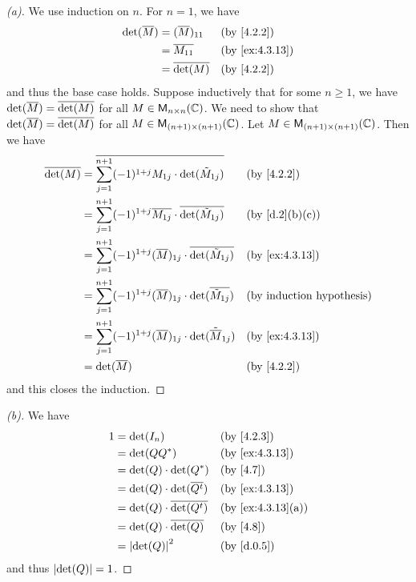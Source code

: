 \begin{proof}[(a)]
  We use induction on \(n\).
  For \(n = 1\), we have
  \begin{align*}
    \det(\conj{M}) & = (\conj{M})_{1 1} &  & \text{(by \cref{4.2.2})}     \\
                   & = \conj{M_{1 1}}   &  & \text{(by \cref{ex:4.3.13})} \\
                   & = \conj{\det(M)}   &  & \text{(by \cref{4.2.2})}
  \end{align*}
  and thus the base case holds.
  Suppose inductively that for some \(n \geq 1\), we have \(\det(\overline{M}) = \overline{\det(M)}\) for all \(M \in \mathsf{M}_{{n} \times n}({\mathbb{C}})\).
  We need to show that \(\det(\overline{M}) = \overline{\det(M)}\) for all \(M \in \mathsf{M}_{{(n + 1)} \times (n + 1)}({\mathbb{C}})\).
  Let \(M \in \mathsf{M}_{{(n + 1)} \times (n + 1)}({\mathbb{C}})\).
  Then we have
  \begin{align*}
    \conj{\det(M)} & = \conj{\sum_{j = 1}^{n + 1} (-1)^{1 + j} M_{1 j} \cdot \det(\tilde{M}_{1 j})}          &  & \text{(by \cref{4.2.2})}         \\
                   & = \sum_{j = 1}^{n + 1} (-1)^{1 + j} \conj{M_{1 j}} \cdot \conj{\det(\tilde{M}_{1 j})}   &  & \text{(by \cref{d.2}(b)(c))}     \\
                   & = \sum_{j = 1}^{n + 1} (-1)^{1 + j} (\conj{M})_{1 j} \cdot \conj{\det(\tilde{M}_{1 j})} &  & \text{(by \cref{ex:4.3.13})}     \\
                   & = \sum_{j = 1}^{n + 1} (-1)^{1 + j} (\conj{M})_{1 j} \cdot \det(\conj{\tilde{M}_{1 j}}) &  & \text{(by induction hypothesis)} \\
                   & = \sum_{j = 1}^{n + 1} (-1)^{1 + j} (\conj{M})_{1 j} \cdot \det(\tilde{\conj{M}}_{1 j}) &  & \text{(by \cref{ex:4.3.13})}     \\
                   & = \det(\conj{M})                                                                        &  & \text{(by \cref{4.2.2})}
  \end{align*}
  and this closes the induction.
\end{proof}

\begin{proof}[(b)]
  We have
  \begin{align*}
    1 & = \det(I_n)                         &  & \text{(by \cref{4.2.3})}        \\
      & = \det(Q Q^*)                       &  & \text{(by \cref{ex:4.3.13})}    \\
      & = \det(Q) \cdot \det(Q^*)           &  & \text{(by \cref{4.7})}          \\
      & = \det(Q) \cdot \det(\conj{\tp{Q}}) &  & \text{(by \cref{ex:4.3.13})}    \\
      & = \det(Q) \cdot \conj{\det(\tp{Q})} &  & \text{(by \cref{ex:4.3.13}(a))} \\
      & = \det(Q) \cdot \conj{\det(Q)}      &  & \text{(by \cref{4.8})}          \\
      & = \abs{\det(Q)}^2                   &  & \text{(by \cref{d.0.5})}
  \end{align*}
  and thus \(\left\lvert\det(Q)\right\rvert = 1\).
\end{proof}

\begin{ex}\label{ex:4.3.18}

\end{ex}
